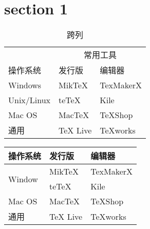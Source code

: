 \documentclass[12pt]{article}
\begin{document}
    \section{section 1}
        \begin{table}[htbp]
            \centering
            \caption{跨列}
            \begin{tabular}{lll}
                \toprule
                \ & %
                \multicolumn{2}{c}{常用工具} \\ %
                \cmidrule{2-3}  %
                操作系统 & 发行版 & 编辑器 \\
                \midrule
                Windows & MikTeX & TexMakerX \\
                Unix/Linux & teTeX & Kile \\
                Mac OS & MacTeX & TeXShop \\
                通用 & TeX Live & TeXworks \\
                \bottomrule
            \end{tabular}
        \end{table}

        \begin{table}[htbp]
            \centering
            \begin{tabular}{lll}
                \toprule
                操作系统 & 发行版 & 编辑器 \\
                \midrule
                \multirow{2}{*}{Window}  %
                & MikTeX & TexMakerX \\   %
                & teTeX & Kile \\
                Mac OS & MacTeX & TeXShop \\
                通用 & TeX Live & TeXworks \\
                \bottomrule
            \end{tabular}
        \end{table} 
        
\end{document}
